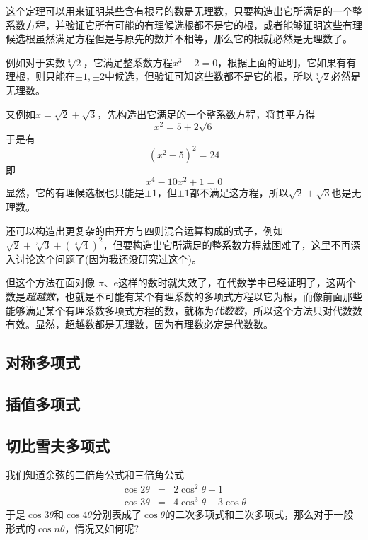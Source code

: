 \begin{example}
  这个定理可以用来证明某些含有根号的数是无理数，只要构造出它所满足的一个整系数方程，并验证它所有可能的有理候选根都不是它的根，或者能够证明这些有理候选根虽然满足方程但是与原先的数并不相等，那么它的根就必然是无理数了。

  例如对于实数$\sqrt[3]{2}$，它满足整系数方程$x^3-2=0$，根据上面的证明，它如果有有理根，则只能在$\pm 1,\pm 2$中候选，但验证可知这些数都不是它的根，所以$\sqrt[3]{2}$必然是无理数。

  又例如$x=\sqrt{2}+\sqrt{3}$，先构造出它满足的一个整系数方程，将其平方得
  \[ x^2 = 5+2 \sqrt{6} \]
  于是有
  \[ (x^2-5)^2 = 24 \]
  即
  \[ x^4 -10 x^2 +1 = 0 \]
  显然，它的有理候选根也只能是$\pm 1$，但$\pm 1$都不满足这方程，所以$\sqrt{2}+\sqrt{3}$也是无理数。

  还可以构造出更复杂的由开方与四则混合运算构成的式子，例如$\sqrt{2}+\sqrt[3]{3}+(\sqrt[4]{4})^2$，但要构造出它所满足的整系数方程就困难了，这里不再深入讨论这个问题了(因为我还没研究过这个)。

  但这个方法在面对像 $\pi$、$\mathrm{e}$这样的数时就失效了，在代数学中已经证明了，这两个数是\emph{超越数}，也就是不可能有某个有理系数的多项式方程以它为根，而像前面那些能够满足某个有理系数多项式方程的数，就称为\emph{代数数}，所以这个方法只对代数数有效。显然，超越数都是无理数，因为有理数必定是代数数。
\end{example}

\subsection{对称多项式}
\label{sec:symmetrical-polynome}



\subsection{插值多项式}
\label{sec:interpolation-polynome}


\subsection{切比雪夫多项式}
\label{sec:chebyshev-polynome}

我们知道余弦的二倍角公式和三倍角公式
\begin{eqnarray*}
  \cos{2\theta} & = & 2\cos^2{\theta}-1 \\
  \cos{3\theta} & = & 4\cos^3{\theta}-3\cos{\theta}
\end{eqnarray*}
于是$\cos{3\theta}$和$\cos{4\theta}$分别表成了$\cos{\theta}$的二次多项式和三次多项式，那么对于一般形式的$\cos{n\theta}$，情况又如何呢?

